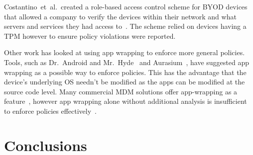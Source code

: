 \documentclass{llncs}
\makeatletter
\newcommand{\etal}{et~al.\@}
\makeatother
\begin{document}
Costantino~\etal~created a role-based access control scheme for BYOD devices that allowed a company to verify the devices within their network and what servers and services they had access to~\cite{costantino_towards_2013}. The scheme relied on devices having a TPM however to ensure policy violations were reported.

Other work has looked at using app wrapping to enforce more general policies.
Tools, such as Dr.~Android and Mr.~Hyde~\cite{jeon_dr._2012} and Aurasium~\cite{xu_aurasium:_2012}, have suggested app wrapping as a possible way to enforce policies.
This has the advantage that the device's underlying OS needn't be modified as the apps can be modified at the source code level.
Many commercial \ac{MDM} solutions offer app-wrapping as a feature~\cite{_ibm_????,_app_????}, however app wrapping alone without additional analysis is insufficient to enforce policies effectively~\cite{hao_effectiveness_2013}.



\section{Conclusions}
\label{sec:conclusions}



{}

\end{document}
